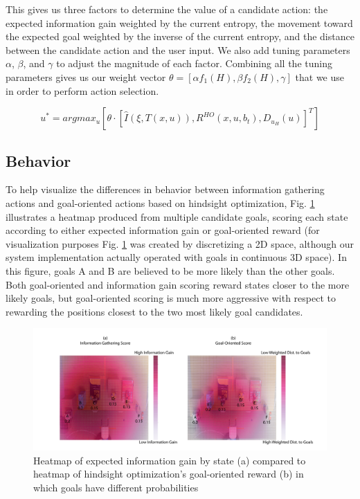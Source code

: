 \documentclass[conference]{IEEEtran}
\begin{document}
This gives us three factors to determine the value of a candidate action: the expected information gain weighted by the current entropy, the movement toward the expected goal weighted by the inverse of the current entropy, and the distance between the candidate action and the user input. We also add tuning parameters $\alpha$, $\beta$, and $\gamma$ to adjust the magnitude of each factor. Combining all the tuning parameters gives us our weight vector $\theta = [\alpha f_1(H), \beta f_2(H), \gamma]$ that we use in order to perform action selection.

\[
u^* = argmax_u [ \theta \cdot [\hat{I}(\xi, T(x,u)), R^{HO}(x,u,b_t), D_{u_H}(u)]^T ]
\]

\subsection{Behavior}

To help visualize the differences in behavior between information gathering actions and goal-oriented actions based on hindsight optimization, Fig. \ref{heatmap2} illustrates a heatmap produced from multiple candidate goals, scoring each state according to either expected information gain or goal-oriented reward (for visualization purposes Fig. \ref{heatmap2} was created by discretizing a 2D space, although our system implementation actually operated with goals in continuous 3D space). In this figure, goals A and B are believed to be more likely than the other goals. Both goal-oriented and information gain scoring reward states closer to the more likely goals, but goal-oriented scoring is much more aggressive with respect to rewarding the positions closest to the two most likely goal candidates.

\begin{figure}
\includegraphics[width=\columnwidth]{figures/Heatmap_Uneven_Belief.pdf}
\caption{Heatmap of expected information gain by state (a) compared to heatmap of hindsight optimization's goal-oriented reward (b) in which goals have different probabilities}
\label{heatmap2}
\end{figure}
\end{document}
